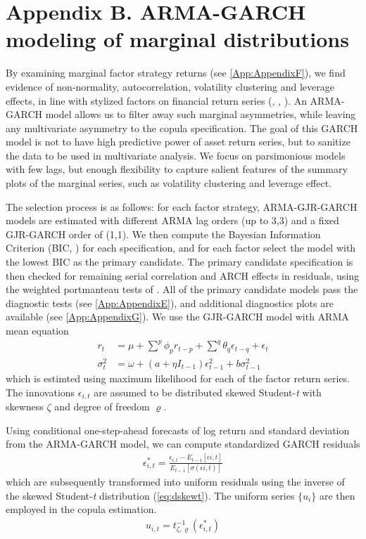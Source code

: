 \newpage
\section{Appendix B. ARMA-GARCH modeling of marginal distributions} \label{App:AppendixB}

By examining marginal factor strategy returns (see \autoref{App:AppendixF}), we find evidence of non-normality, autocorrelation, volatility clustering and leverage effects, in line with stylized factors on financial return series (\textcite{Bollerslev1986}, \textcite{Black1976}, \textcite{glosten1993relation}). An ARMA-GARCH model allows us to filter away such marginal asymmetries, while leaving any multivariate asymmetry to the copula specification. The goal of this GARCH model is not to have high predictive power of asset return series, but to sanitize the data to be used in multivariate analysis. We focus on parsimonious models with few lags, but enough flexibility to capture salient features of the summary plots of the marginal series, such as volatility clustering and leverage effect.

The selection process is as follows: for each factor strategy, ARMA-GJR-GARCH models are estimated with different ARMA lag orders (up to 3,3) and a fixed GJR-GARCH order of (1,1). We then compute the Bayesian Information Criterion (BIC, \textcite{Schwarz1978}) for each specification, and for each factor select the model with the lowest BIC as the primary candidate. The primary candidate specification is then checked for remaining serial correlation and ARCH effects in residuals, using the weighted portmanteau tests of \textcite{FisherGallagher2012}. All of the primary candidate models pass the diagnostic tests (see \autoref{App:AppendixE}), and additional diagnostics plots are available (see \autoref{App:AppendixG}). We use the GJR-GARCH model with ARMA mean equation
\begin{align}
    r_t &= \mu + \sum^p \phi_p r_{t-p} + \sum^q \theta_q \epsilon_{t-q} + \epsilon_{t}  \\
    \sigma_{t}^2 &= \omega + (a + \eta I_{t-1}) \epsilon_{t-1}^2 + b \sigma^2_{t-1}
\end{align}
which is estimted using maximum likelihood for each of the factor return series. The innovations $\epsilon_{i,t}$ are assumed to be distributed skewed Student-\textit{t} with skewness $\zeta$ and degree of freedom $\varrho$.

Using conditional one-step-ahead forecasts of log return and standard deviation from the ARMA-GARCH model, we can compute standardized GARCH residuals
\begin{align}
    \epsilon^*_{i,t} = \frac{\epsilon_{i,t} - E_{t-1}[\epsilon{i,t}]}{E_{t-1}[\sigma(\epsilon{i,t})]}
\end{align}
which are subsequently transformed into uniform residuals using the inverse of the skewed Student-\textit{t} distribution (\autoref{eq:dskewt}). The uniform series $\{u_i\}$ are then employed in the copula estimation.
\begin{align}
    u_{i,t} = t^{-1}_{\zeta, \varrho}(\epsilon^*_{i,t})
\end{align}

